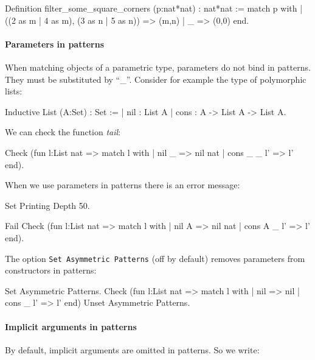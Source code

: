 \begin{coq_example}
Definition filter_some_square_corners (p:nat*nat) : nat*nat :=
  match p with
  | ((2 as m | 4 as m), (3 as n | 5 as n)) => (m,n)
  | _ => (0,0)
  end.
\end{coq_example}

\paragraph{Parameters in patterns}
When matching objects of a parametric type, parameters do not bind in patterns.
They must be substituted by ``\_''.
Consider for example the type of polymorphic lists:

\begin{coq_example}
Inductive List (A:Set) : Set :=
  | nil : List A
  | cons : A -> List A -> List A.
\end{coq_example}

We can check the function {\em tail}:

\begin{coq_example}
Check
  (fun l:List nat =>
     match l with
     | nil _ => nil nat
     | cons _ _ l' => l'
     end).
\end{coq_example}


When we use parameters in patterns there is an error message:
\begin{coq_eval}
Set Printing Depth 50.
\end{coq_eval}
\begin{coq_example}
Fail Check
  (fun l:List nat =>
     match l with
     | nil A => nil nat
     | cons A _ l' => l'
     end).
\end{coq_example}

The option {\tt Set Asymmetric Patterns} 
(off by default) removes parameters from constructors in patterns:
\begin{coq_example}
  Set Asymmetric Patterns.
  Check (fun l:List nat =>
    match l with
    | nil => nil
    | cons _ l' => l'
    end)
  Unset Asymmetric Patterns.
\end{coq_example}

\paragraph{Implicit arguments in patterns}
By default, implicit arguments are omitted in patterns. So we write:

